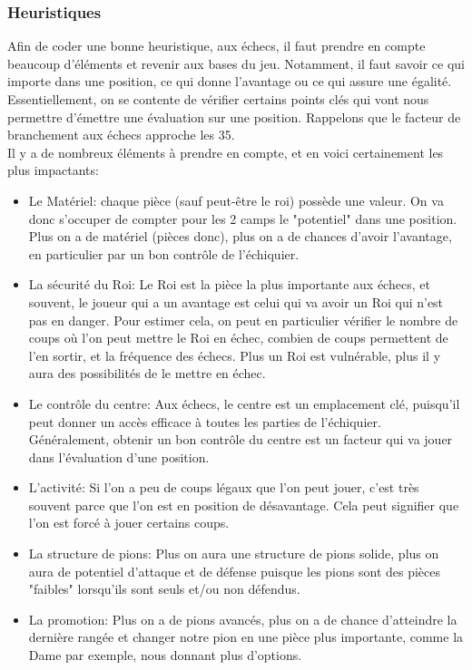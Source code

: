 \documentclass{article}
\begin{document}
\subsubsection{Heuristiques}
Afin de coder une bonne heuristique, aux échecs, il faut prendre en compte beaucoup d'éléments et revenir aux bases du jeu.
Notamment, il faut savoir ce qui importe dans une position, ce qui donne l'avantage ou ce qui assure une égalité. Essentiellement,
on se contente de vérifier certains points clés qui vont nous permettre d'émettre une évaluation sur une position.
Rappelons que le facteur de branchement aux échecs approche les 35.\\
Il y a de nombreux éléments à prendre en compte, et en voici certainement les plus impactants:
\begin{itemize}
    \item Le Matériel: chaque pièce (sauf peut-être le roi) possède une valeur. On va donc s'occuper de compter pour les 2 camps le "potentiel"
    dans une position. Plus on a de matériel (pièces donc), plus on a de chances d'avoir l'avantage, en particulier par un bon contrôle de l'échiquier.
    \item La sécurité du Roi: Le Roi est la pièce la plus importante aux échecs, et souvent, le joueur qui a un avantage est celui qui va
    avoir un Roi qui n'est pas en danger. Pour estimer cela, on peut en particulier vérifier le nombre de coups où l'on peut mettre le Roi en échec,
    combien de coups permettent de l'en sortir, et la fréquence des échecs. Plus un Roi est vulnérable, plus il y aura des possibilités
    de le mettre en échec.
    \item Le contrôle du centre: Aux échecs, le centre est un emplacement clé, puisqu'il peut donner un accès efficace à toutes les parties de
    l'échiquier. Généralement, obtenir un bon contrôle du centre est un facteur qui va jouer dans l'évaluation d'une position.
    \item L'activité: Si l'on a peu de coups légaux que l'on peut jouer, c'est très souvent parce que l'on est en position de désavantage. Cela peut
    signifier que l'on est forcé à jouer certains coups.
    \item La structure de pions: Plus on aura une structure de pions solide, plus on aura de potentiel d'attaque et de défense puisque les pions sont
    des pièces "faibles" lorsqu'ils sont seuls et/ou non défendus.
    \item La promotion: Plus on a de pions avancés, plus on a de chance d'atteindre la dernière rangée et changer notre pion en une pièce plus importante,
    comme la Dame par exemple, nous donnant plus d'options.\\
\end{itemize}
\end{document}
